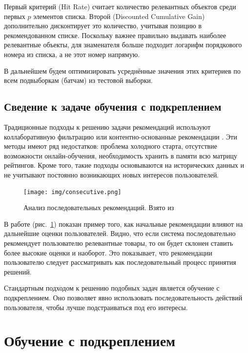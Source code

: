 \documentclass[14pt]{extarticle}
\begin{document}
Первый критерий (Hit Rate) считает количество релевантных объектов среди первых $p$ элементов списка. Второй (Discounted Cumulative Gain) дополнительно дисконтирует это количество, учитывая позицию в рекомендованном списке. Поскольку важнее правильно выдавать наиболее релевантные объекты, для знаменателя больше подходит логарифм порядкового номера из списка, а не этот номер напрямую. 

В дальнейшем будем оптимизировать усреднённые значения этих критериев по всем подвыборкам (батчам) из тестовой выборки.

\subsection{Сведение к задаче обучения с подкреплением} 

Традиционные подходы к решению задачи рекомендаций используют коллаборативную фильтрацию \cite{CF_MF, GoogleNewsCF} или контентно-основанные рекомендации \cite{content-based, content-based_news}. Эти методы имеют ряд недостатков: проблема холодного старта, отсутствие возможности онлайн-обучения, необходимость хранить в памяти всю матрицу рейтингов. Кроме того, такие подходы основываются
на исторических данных и не учитывают постоянно возникающих новых интересов пользователей.

\begin{figure}[h]
	\centering
	\texttt{[image: img/consecutive.png]}
	\caption{Анализ последовательных рекомендаций. Взято из \cite{Liu2018DeepRL}}
	\label{fig:consequtive}
\end{figure}

В работе \cite{Liu2018DeepRL} (рис.~\ref{fig:consequtive}) показан пример того, как начальные рекомендации влияют на дальнейшие оценки пользователей. Видно, что если система последовательно рекомендует пользователю релевантные товары, то он будет склонен ставить более высокие оценки и наоборот. Это показывает, что рекомендации пользователю следует рассматривать как последовательный процесс принятия решений.

Стандартным подходом к решению подобных задач является обучение с подкреплением. Оно позволяет явно использовать последовательность действий пользователя, чтобы лучше подстраиваться под его интересы. 

\newpage

\section{Обучение с подкреплением}
\end{document}
